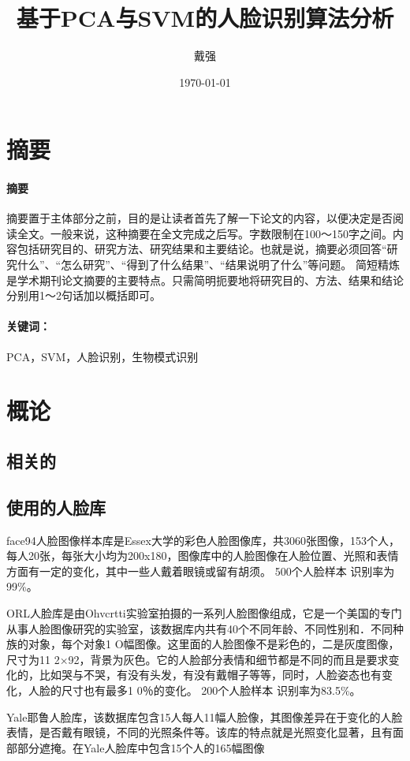 \documentclass{ctexart}
\title{基于PCA与SVM的人脸识别算法分析}
\author{戴强}
\date{\today}
\renewenvironment*{abstract}[1]{%
\newcommand\gjc{#1}
\paragraph{摘要}
}{\paragraph{关键词：}\gjc }
\begin{document}
\maketitle

\section{摘要}
\label{sec:zhaiyao}

\begin{abstract}{PCA，SVM，人脸识别，生物模式识别}
摘要置于主体部分之前，目的是让读者首先了解一下论文的内容，以便决定是否阅读全文。一般来说，这种摘要在全文完成之后写。字数限制在100～150字之间。内容包括研究目的、研究方法、研究结果和主要结论。也就是说，摘要必须回答“研究什么”、“怎么研究”、“得到了什么结果”、“结果说明了什么”等问题。
简短精炼是学术期刊论文摘要的主要特点。只需简明扼要地将研究目的、方法、结果和结论分别用1～2句话加以概括即可。
\end{abstract}


\newpage

\tableofcontents

\newpage


\section{概论}

\subsection{相关的}

\subsection{使用的人脸库}

face94人脸图像样本库是Essex大学的彩色人脸图像库，共3060张图像，153个人，每人20张，每张大小均为200x180，图像库中的人脸图像在人脸位置、光照和表情方面有一定的变化，其中一些人戴着眼镜或留有胡须。
500个人脸样本 识别率为99\%。

ORL人脸库是由Ohvcrtti实验室拍摄的一系列人脸图像组成，它是一个美国的专门从事人脸图像研究的实验室，该数据库内共有40个不同年龄、不同性别和．不同种族的对象，每个对象1 O幅图像。这里面的人脸图像不是彩色的，二是灰度图像，尺寸为11 2×92，背景为灰色。它的人脸部分表情和细节都是不同的而且是要求变化的，比如哭与不哭，有没有头发，有没有戴帽子等等，同时，人脸姿态也有变化，人脸的尺寸也有最多1 0％的变化。
200个人脸样本 识别率为83.5\%。


Yale耶鲁人脸库，该数据库包含15人每人11幅人脸像，其图像差异在于变化的人脸表情，是否戴有眼镜，不同的光照条件等。该库的特点就是光照变化显著，且有面部部分遮掩。在Yale人脸库中包含15个人的165幅图像
\end{document}
